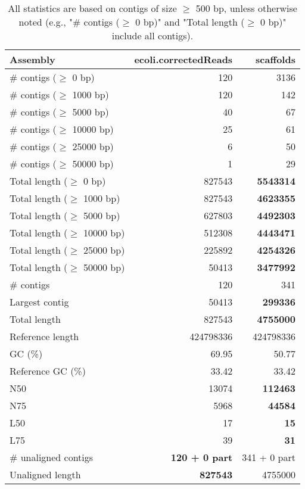 \documentclass[12pt,a4paper]{article}
\begin{document}
\begin{table}[ht]
\begin{center}
\caption{All statistics are based on contigs of size $\geq$ 500 bp, unless otherwise noted (e.g., "\# contigs ($\geq$ 0 bp)" and "Total length ($\geq$ 0 bp)" include all contigs).}
\begin{tabular}{|l*{2}{|r}|}
\hline
Assembly & ecoli.correctedReads & scaffolds \\ \hline
\# contigs ($\geq$ 0 bp) & 120 & 3136 \\ \hline
\# contigs ($\geq$ 1000 bp) & 120 & 142 \\ \hline
\# contigs ($\geq$ 5000 bp) & 40 & 67 \\ \hline
\# contigs ($\geq$ 10000 bp) & 25 & 61 \\ \hline
\# contigs ($\geq$ 25000 bp) & 6 & 50 \\ \hline
\# contigs ($\geq$ 50000 bp) & 1 & 29 \\ \hline
Total length ($\geq$ 0 bp) & 827543 & {\bf 5543314} \\ \hline
Total length ($\geq$ 1000 bp) & 827543 & {\bf 4623355} \\ \hline
Total length ($\geq$ 5000 bp) & 627803 & {\bf 4492303} \\ \hline
Total length ($\geq$ 10000 bp) & 512308 & {\bf 4443471} \\ \hline
Total length ($\geq$ 25000 bp) & 225892 & {\bf 4254326} \\ \hline
Total length ($\geq$ 50000 bp) & 50413 & {\bf 3477992} \\ \hline
\# contigs & 120 & 341 \\ \hline
Largest contig & 50413 & {\bf 299336} \\ \hline
Total length & 827543 & {\bf 4755000} \\ \hline
Reference length & 424798336 & 424798336 \\ \hline
GC (\%) & 69.95 & 50.77 \\ \hline
Reference GC (\%) & 33.42 & 33.42 \\ \hline
N50 & 13074 & {\bf 112463} \\ \hline
N75 & 5968 & {\bf 44584} \\ \hline
L50 & 17 & {\bf 15} \\ \hline
L75 & 39 & {\bf 31} \\ \hline
\# unaligned contigs & {\bf 120 + 0 part} & 341 + 0 part \\ \hline
Unaligned length & {\bf 827543} & 4755000 \\ \hline

\end{tabular}
\end{center}
\end{table}
\end{document}
